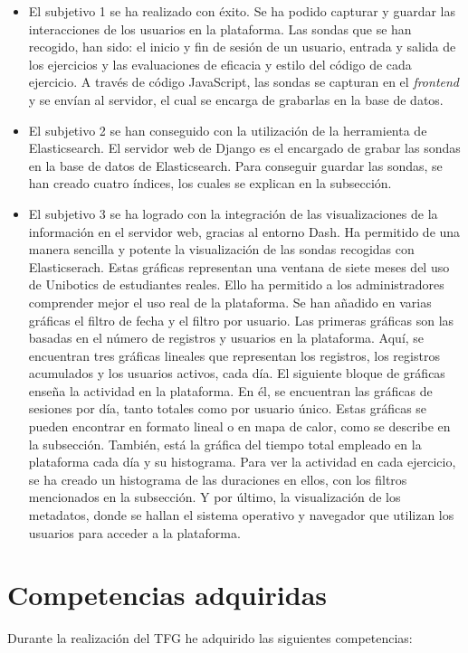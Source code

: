 \begin{itemize}
\item  El subjetivo 1 se ha realizado con éxito. Se ha podido capturar y guardar las interacciones de los usuarios en la plataforma. Las sondas que se han recogido, han sido: el inicio y fin de sesión de un usuario, entrada y salida de los ejercicios y las evaluaciones de eficacia y estilo del código de cada ejercicio. A través de código JavaScript, las sondas se capturan en el \textit{frontend} y se envían al servidor, el cual se encarga de grabarlas en la base de datos.
\newpage
\item  El subjetivo 2 se han conseguido con la utilización de la herramienta de Elasticsearch. El servidor web de Django es el encargado de grabar las sondas en la base de datos de Elasticsearch. Para conseguir guardar las sondas, se han creado cuatro índices, los cuales se explican en la subsección.

\item El subjetivo 3 se ha logrado con la integración de las visualizaciones de la información en el servidor web, gracias al entorno Dash. Ha permitido de una manera sencilla y potente la visualización de las sondas recogidas con Elasticserach. Estas gráficas representan una ventana de siete meses del uso de Unibotics de estudiantes reales. Ello ha permitido a los administradores comprender mejor el uso real de la plataforma. Se han añadido en varias gráficas el filtro de fecha y el filtro por usuario. Las primeras gráficas son las basadas en el número de registros y usuarios en la plataforma. Aquí, se encuentran tres gráficas lineales que representan los registros, los registros acumulados y los usuarios activos, cada día. El siguiente bloque de gráficas enseña la actividad en la plataforma. En él, se encuentran las gráficas de sesiones por día, tanto totales como por usuario único. Estas gráficas se pueden encontrar en formato lineal o en mapa de calor, como se describe en la subsección. También, está la gráfica del tiempo total empleado en la plataforma cada día y su histograma. Para ver la actividad en cada ejercicio, se ha creado un histograma de las duraciones en ellos, con los filtros mencionados en la subsección.  Y por último, la visualización de los metadatos, donde se hallan el sistema operativo y navegador que utilizan los usuarios para acceder a la plataforma.
\end{itemize}

	\section{Competencias adquiridas} 
	\label{sec:competencias_adquiridas} 
	Durante la realización del TFG he adquirido las siguientes competencias:
		
